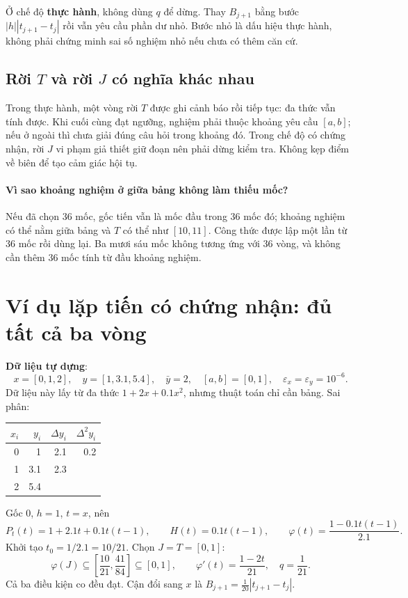 Ở chế độ \textbf{thực hành}, không dùng $q$ để dừng. Thay $B_{j+1}$ bằng bước $|h||t_{j+1}-t_j|$ rồi vẫn yêu cầu phần dư nhỏ. Bước nhỏ là dấu hiệu thực hành, không phải chứng minh sai số nghiệm nhỏ nếu chưa có thêm căn cứ.

\subsection{Rời $T$ và rời $J$ có nghĩa khác nhau}
Trong thực hành, một vòng rời $T$ được ghi cảnh báo rồi tiếp tục: đa thức vẫn tính được. Khi cuối cùng đạt ngưỡng, nghiệm phải thuộc khoảng yêu cầu $[a,b]$; nếu ở ngoài thì chưa giải đúng câu hỏi trong khoảng đó. Trong chế độ có chứng nhận, rời $J$ vi phạm giả thiết giữ đoạn nên phải dừng kiểm tra. Không kẹp điểm về biên để tạo cảm giác hội tụ.

\paragraph{Vì sao khoảng nghiệm ở giữa bảng không làm thiếu mốc?} Nếu đã chọn 36 mốc, gốc tiến vẫn là mốc đầu trong 36 mốc đó; khoảng nghiệm có thể nằm giữa bảng và $T$ có thể như $[10,11]$. Công thức được lập một lần từ 36 mốc rồi dùng lại. Ba mươi sáu mốc không tương ứng với 36 vòng, và không cần thêm 36 mốc tính từ đầu khoảng nghiệm.

\section{Ví dụ lặp tiến có chứng nhận: đủ tất cả ba vòng}
\label{sec:inverse-forward-example}
\textbf{Dữ liệu tự dựng}:
\[
 x=[0,1,2],\quad y=[1,3.1,5.4],\quad \bar y=2,\quad
 [a,b]=[0,1],\quad\varepsilon_x=\varepsilon_y=10^{-6}.
\]
Dữ liệu này lấy từ đa thức $1+2x+0.1x^2$, nhưng thuật toán chỉ cần bảng. Sai phân:
\begin{center}\begin{tabular}{@{}rrrr@{}}\toprule
$x_i$ & $y_i$ & $\Delta y_i$ & $\Delta^2y_i$\\\midrule
0 & 1 & 2.1 & 0.2\\
1 & 3.1 & 2.3 & \\
2 & 5.4 & & \\\bottomrule
\end{tabular}\end{center}
Gốc 0, $h=1$, $t=x$, nên
\[
 P_t(t)=1+2.1t+0.1t(t-1),\qquad
 H(t)=0.1t(t-1),\qquad
 \varphi(t)=\frac{1-0.1t(t-1)}{2.1}.
\]
Khởi tạo $t_0=1/2.1=10/21$. Chọn $J=T=[0,1]$:
\[
 \varphi(J)\subseteq\left[\frac{10}{21},\frac{41}{84}\right]\subseteq[0,1],
 \qquad \varphi'(t)=\frac{1-2t}{21},\quad q=\frac1{21}.
\]
Cả ba điều kiện co đều đạt. Cận đổi sang $x$ là $B_{j+1}=\frac1{20}|t_{j+1}-t_j|$.

